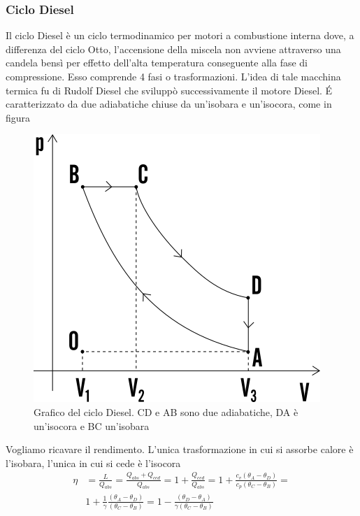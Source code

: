 \documentclass[
10pt, %
a4paper, %
oneside, %
headinclude,footinclude, %
BCOR5mm, %
]{scrartcl}
\begin{document}
\subsubsection{Ciclo Diesel}
Il ciclo Diesel è un ciclo termodinamico per motori a combustione interna dove, a differenza del ciclo Otto, l'accensione della miscela non avviene attraverso una candela bensì per effetto dell'alta temperatura conseguente alla fase di compressione. Esso comprende 4 fasi o trasformazioni. L'idea di tale macchina termica fu di Rudolf Diesel che sviluppò successivamente il motore Diesel. \'{E} caratterizzato da due adiabatiche chiuse da un'isobara e un'isocora, come in figura
\begin{figure}[h!]
	\centering
	\includegraphics[width=0.4\linewidth]{../images/ciclo-diesel}
	\caption{Grafico del ciclo Diesel. CD e AB sono due adiabatiche, DA è un'isocora e BC un'isobara}
	\label{fig:ciclo-diesel}
\end{figure}
\FloatBarrier
Vogliamo ricavare il rendimento. L'unica trasformazione in cui si assorbe calore è l'isobara, l'unica in cui si cede è l'isocora
\begin{align*}
	\eta &= \frac{L}{Q_{abs}} = \frac{Q_{abs}+Q_{ced}}{Q_{abs}} = 1 +\frac{Q_{ced}}{Q_{abs}} = 1 + \frac{c_v(\theta_A-\theta_D)}{c_p(\theta_C-\theta_B)} =\\ &1+\frac{1}{\gamma}\frac{(\theta_A-\theta_D)}{(\theta_C-\theta_B)} = 1 - \frac{(\theta_D-\theta_A)}{\gamma(\theta_C-\theta_B)}
\end{align*}
\end{document}
